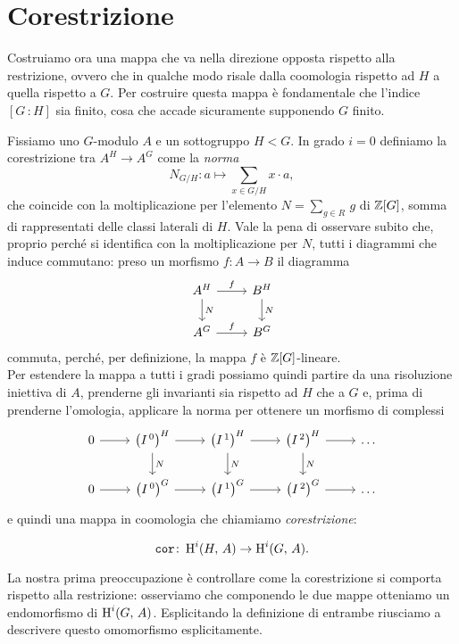 \section{Corestrizione}
Costruiamo ora una mappa che va nella direzione opposta rispetto alla restrizione, ovvero che in qualche modo risale dalla coomologia rispetto ad $ H $ a quella rispetto a $ G $. Per costruire questa mappa è fondamentale che l'indice $ [G \, \colon H] $ sia finito, cosa che accade sicuramente supponendo $ G $ finito.

\begin{definition}[Corestrizione]
Fissiamo uno $ G $-modulo $ A $ e un sottogruppo $ H < G $. In grado $ i = 0 $ definiamo la corestrizione tra $ A^H \to A^G $  come la \emph{norma}
\[N_{G/H} \colon a \mapsto \sum_{x \in G/H} x \cdot a, \]
che coincide con la moltiplicazione per l'elemento $ N = \sum_{g \in R} \, g $ di $ \mathbb{Z}[G] $, somma di rappresentati delle classi laterali di $ H $. Vale la pena di osservare subito che, proprio perché si identifica con la moltiplicazione per $ N $, tutti i diagrammi che induce commutano: preso un morfismo $ f \colon A \to B $ il diagramma
\[\begin{tikzcd}
A^H \rar["f"] \dar{N} 
& B^H \arrow[d, "N"]\\
A^G \rar["f"]
& B^G
\end{tikzcd}\] 
commuta, perché, per definizione, la mappa $ f $ è $ \mathbb{Z}[G] $-lineare. \todo[sistemare] \\

Per estendere la mappa a tutti i gradi possiamo quindi partire da una risoluzione iniettiva di $ A $, prenderne gli invarianti sia rispetto ad $ H $ che a $ G $ e, prima di prenderne l'omologia, applicare la norma per ottenere un morfismo di complessi
\[\begin{tikzcd}
0 \rar
& \left(I^{\,0}\right)^H \rar \dar["N"]
& \left(I^{\,1}\right)^H \rar \dar["N"]
& \left(I^{\,2}\right)^H \rar \dar["N"]
& \dots \\
0 \rar
& \left(I^{\,0}\right)^{G} \rar
& \left(I^{\,1}\right)^{G} \rar
& \left(I^{\,2}\right)^{G} \rar
& \dots
\end{tikzcd} \]
e quindi una mappa in coomologia che chiamiamo \emph{corestrizione}:

\[ \operatorname{\mathtt{cor}} \colon \operatorname{H}^i(H, \, A) \to \operatorname{H}^i(G, \, A). \]

\end{definition}

La nostra prima preoccupazione è controllare come la corestrizione si comporta rispetto alla restrizione: osserviamo che componendo le due mappe otteniamo un endomorfismo di $ \operatorname{H}^i(G, \, A) $. Esplicitando la definizione di entrambe riusciamo a descrivere questo omomorfismo esplicitamente.


